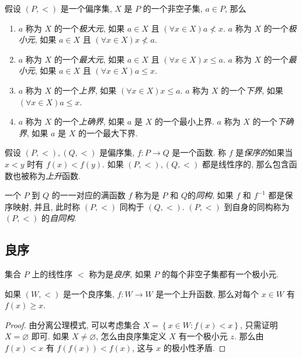 假设 \( (P, <) \) 是一个偏序集, \( X \) 是 \( P \) 的一个非空子集, \( a \in P
\), 那么
\begin{enumerate}
  \item \( a \) 称为 \( X \) 的一个\emph{极大元}, 如果 \( a \in X \) 且 
    \( (\forall x \in X) a \not < x \).
    \( a \) 称为 \( X \) 的一个\emph{极小元}, 如果 \( a \in X \) 且
    \( (\forall x \in X) x \not < a \).
  \item \( a \) 称为 \( X \) 的一个\emph{最大元}, 如果 \( a \in X \) 且
    \( (\forall x \in X) x \leq a \).
    \( a \) 称为 \( X \) 的一个\emph{最小元}, 如果 \( a \in X \) 且
    \( (\forall x \in X) a \leq x \).
  \item \( a \) 称为 \( X \) 的一个\emph{上界}, 如果
    \( (\forall x \in X) x \leq a\).
    \( a \) 称为 \( X \) 的一个\emph{下界}, 如果
    \( (\forall x \in X) a \leq x\).
  \item \( a \) 称为 \( X \) 的一个\emph{上确界}, 如果 \( a \) 是 \( X \)
    的一个最小上界.
    \( a \) 称为 \( X \) 的一个\emph{下确界}, 如果 \( a \) 是 \( X \)
    的一个最大下界.
\end{enumerate}

假设 \( (P, <), (Q, <) \) 是偏序集, \( f: P \to Q \) 是一个函数.
称 \( f \) 是\emph{保序的}如果当 \( x < y \) 时有 \( f(x) < f(y) \).
如果 \( (P, <), (Q, <) \) 都是线性序的, 那么包含函数也被称为\emph{上升}函数.

一个 \( P \) 到 \( Q \) 的一一对应的满函数 \( f \) 称为是 \( P \) 和 \( Q \)的\emph{同构},
如果 \( f \) 和 \( f^{-1} \) 都是保序映射, 并且, 此时称 \( (P, <) \) 同构于 \(
(Q, <)\).
\( (P, <) \) 到自身的同构称为 \( (P, <) \) 的\emph{自同构}.

\subsection{良序}

集合 \( P \) 上的线性序 \( < \) 称为是\emph{良序}, 如果 \( P \)
的每个非空子集都有一个极小元.

\begin{lemma}
  \label{lemma-well-order-set-increasing-funcion-to-itself}
  如果 \( (W, <) \) 是一个良序集, \( f: W \to W \) 是一个上升函数, 那么对每个
  \( x \in W \) 有 \( f(x) \geq x \).
\end{lemma}
\begin{proof}
  由分离公理模式, 可以考虑集合 \( X = \left\lbrace x \in W: f(x) < x
  \right\rbrace \), 只需证明 \( X = \varnothing \) 即可.
  如果 \( X \neq \varnothing \), 怎么由良序集定义 \( X \)
  有一个极小元 \( z \).
  那么由 \( f(x) < x \) 有 \( f(f(x)) < f(x) \), 这与 \( x \) 的极小性矛盾.
\end{proof}

